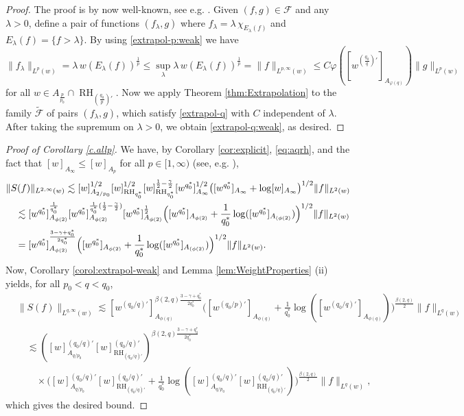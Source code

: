\documentclass[11pt,reqno]{amsart}
\theoremstyle{plain} %
\newcommand{\1}{ \mathbbm{1}}   %
\theoremstyle{definition}
\theoremstyle{remark}
\numberwithin{equation}{section}
\begin{document}
\begin{proof}
The proof is by now well-known, see e.g. \cites{AuscherMartellIGeneral,GM}. Given $(f,g)\in \mathcal{F}$
and  any $\lambda>0$, define a pair of functions $(f_\lambda,g)$
where $f_\lambda=\lambda\,\chi_{E_\lambda(f)}$   and
$E_\lambda(f)=\{f>\lambda\}$. By using \eqref{extrapol-p:weak} we have
$$
\|f_\lambda\|_{L^p(w)}
=
\lambda\,w(E_\lambda(f))^\frac1p
\le
\sup_\lambda \lambda\,w(E_\lambda(f))^\frac1p
=
\|f\|_{L^{p,\infty}(w)}
\le
 C \varphi([w^{(\frac{q_{0}}{q})'}]_{A_{\varphi(q)}})\|g\|_{L^{p}(w)}
$$
for all $w\in A_{\frac{p}{p_0}}\cap \operatorname{RH}_{(\frac{q_0}{p})'}
$.  Now we apply Theorem \ref{thm:Extrapolation} to the family
$\widetilde{\mathcal{F}}$ of  pairs $(f_\lambda,g)$, which satisfy \eqref{extrapol-q} with
$C$ independent of $\lambda$. After taking the supremum on
$\lambda>0$, we obtain \eqref{extrapol-q:weak}, as desired.
\end{proof}


\begin{proof}[Proof of Corollary \ref{c.allp}]
We have, by Corollary \ref{cor:explicit}, \eqref{eq:aqrh}, and the fact that $[w]_{A_{\infty}}\le [w]_{A_p}$ for all $p\in [1,\infty)$ (see, e.g. \cite{HP}),
\begin{align}
\label{eq:loss}
\notag &\|S(f)\|_{L^{2,\infty}(w)} \lesssim[w]_{A_{2/p_0}}^{1/2} [w]_{ \operatorname{RH}_{q_0^*}}^{1/2}[w]_{ \operatorname{RH}_{q_0^*}}^{\frac12-\frac{\gamma}{2}}   [w^{q_0^*}]_{A_{\infty}}^{1/2} \big(  [w^{q_0^*}]_{A_{\infty}} +\log[w]_{A_{\infty}}\big)^{1/2}\|f\|_{L^2(w)}\\
&\quad\lesssim  [w^{q_0^*}]_{A_{\phi(2)}}^{\frac{1}{q_0^*}}[w^{q_0^*}]_{A_{\phi(2)}}^{\frac{1}{q_0^*}(\frac{1}{2}-\frac{\gamma}{2})}[w^{q_0^*}]_{A_{\phi(2)}}^{\frac12}\Big([w^{q_0^*}]_{A_{\phi(2)}}+\frac{1}{q_0^*}\log([w^{q_0^*}]_{A_{(\phi(2)}})\Big)^{1/2}\|f\|_{L^2(w)}\\
&\quad= [w^{q_0^*}]_{A_{\phi(2)}}^{\frac{3-\gamma+q_0^*}{ 2q^*_0}}\Big([w^{q_0^*}]_{A_{\phi(2)}}+\frac{1}{q_0^*}\log([w^{q_0^*}]_{A_{(\phi(2)}})\Big)^{1/2}\|f\|_{L^2(w)}.
\end{align}
Now, Corollary \ref{corol:extrapol-weak} and Lemma \ref{lem:WeightProperties} (ii) yields, for all $p_{0} < q < q_{0}$,
\begin{align*}
&\|S(f)\|_{L^{q,\infty}(w)} \lesssim [w^{(q_0/q)'}]_{A_{\phi(q)}}^{\beta(2,q){\frac{3-\gamma+q_0^*}{ 2q^*_0}}}\Big([w^{(q_0/p)'}]_{A_{\phi(q)}}+\frac{1}{q_0^*}\log([w^{(q_0/q)'}]_{A_{\phi(q)}})\Big)^{\frac{\beta(2,q)}{2}}\|f\|_{L^q(w)}\\
&\quad \lesssim ([w]^{(q_0/q)'}_{A_{q/p_0}}[w]^{(q_0/q)'}_{\operatorname{RH}_{(q_0/q)'}})^{\beta(2,q){\frac{3-\gamma+q_0^*}{ 2q^*_0}}}\\
&\quad \quad\times\Big([w]^{(q_0/q)'}_{A_{q/p_0}}[w]^{(q_0/q)'}_{\operatorname{RH}_{(q_0/q)'}}+\frac{1}{q_0^*}\log([w]^{(q_0/q)'}_{A_{q/p_0}}[w]^{(q_0/q)'}_{\operatorname{RH}_{(q_0/q)'}})\Big)^{\frac{\beta(2,q)}{2}}\|f\|_{L^q(w)},
\end{align*}
which gives the desired bound.
\end{proof}
\end{document}
